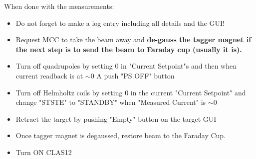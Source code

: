 When done with the measurements:
\begin{itemize}
\item Do not forget to make a log entry including all details and the GUI! 

\item Request MCC to take the beam away and \textbf{de-gauss the tagger
magnet if the next step is to send the beam to Faraday cup (usually it is).}

\item Turn off quadrupoles by setting $0$ in "Current Setpoint"s and then when current readback is at $\sim 0$ A push "PS OFF" button

\item Turn off Helmholtz coils by setting $0$ in the current "Current Setpoint" and change "STSTE" to "STANDBY" when "Measured Current" is $\sim 0$

\item Retract the target by pushing "Empty" button on the target GUI

\item Once tagger magnet is degaussed, restore beam to the Faraday Cup.

\item Turn ON CLAS12
\end{itemize}





